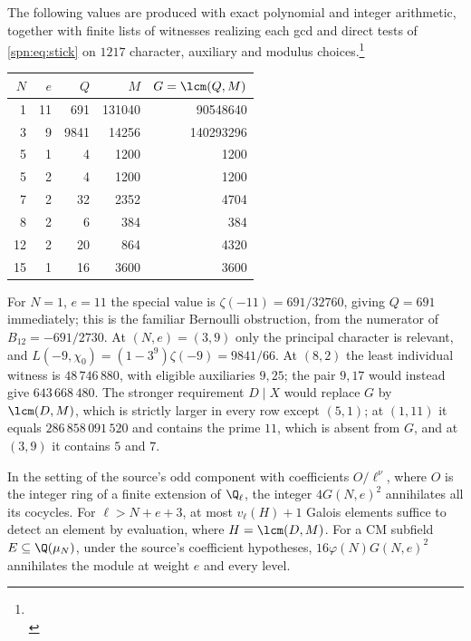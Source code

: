 \begin{example}\label{spn:ex:stick-table}
The following values are produced with exact polynomial and integer
arithmetic, together with finite lists of witnesses realizing each gcd and
direct tests of \eqref{spn:eq:stick} on $1217$ character, auxiliary and
modulus
choices.\footnote{\\
}
\begin{center}
\begin{tabular}{rrrrr}
\toprule
$N$ & $e$ & $Q$ & $M$ & $G=\lcm(Q,M)$\\
\midrule
1&11&691&131040&90548640\\
3&9&9841&14256&140293296\\
5&1&4&1200&1200\\
5&2&4&1200&1200\\
7&2&32&2352&4704\\
8&2&6&384&384\\
12&2&20&864&4320\\
15&1&16&3600&3600\\
\bottomrule
\end{tabular}
\end{center}
For $N=1$, $e=11$ the special value is $\zeta(-11)=691/32760$, giving
$Q=691$ immediately; this is the familiar Bernoulli obstruction, from the
numerator of $B_{12}=-691/2730$. At $(N,e)=(3,9)$ only the principal
character is relevant, and $L(-9,\chi_0)=(1-3^9)\zeta(-9)=9841/66$. At
$(8,2)$ the least individual witness is $48\,746\,880$, with eligible
auxiliaries $9,25$; the pair $9,17$ would instead give $643\,668\,480$. The
stronger requirement $D\mid X$ would replace $G$ by $\lcm(D,M)$, which is
strictly larger in every row except $(5,1)$; at $(1,11)$ it equals
$286\,858\,091\,520$ and contains the prime $11$, which is absent from $G$,
and at $(3,9)$ it contains $5$ and $7$.
\end{example}

\begin{corollary}\label{spn:cor:kill}
In the setting of the source's odd component with coefficients $O/\ell^\nu$,
where $O$ is the integer ring of a finite extension of $\Q_\ell$, the integer
$4G(N,e)^2$ annihilates all its cocycles. For $\ell>N+e+3$, at most
$v_\ell(H)+1$ Galois elements suffice to detect an element by evaluation,
where $H=\lcm(D,M)$. For a CM subfield
$E\subseteq\Q(\mu_N)$, under the source's coefficient hypotheses,
$16\varphi(N)G(N,e)^2$ annihilates the module \textup{} at
weight $e$ and every level.
\end{corollary}

